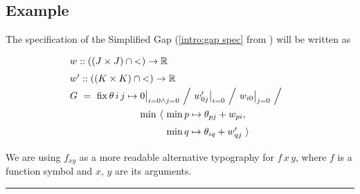 \subsection{Example \hrulefill}

The specification of the Simplified Gap (\eqref{intro:gap spec} from ) will be written as
%
\begin{equation}
  \renewcommand\arraystretch{1.5}
  \begin{array}{@{}l@{}l@{}l@{}}
    \lspan3{w :: ((J\times J)\cap{<})\to\R} \\
    \lspan3{w' :: ((K\times K)\cap{<})\to\R} \\
    G ~=~ \fix \theta\,i\,j\mapsto{}
      & \lspan2{0\big|_{i=0\land j=0} ~\Big/~ w'_{0j}\big|_{i=0} ~\Big/~ w_{i0}\big|_{j=0} ~\Big/~} \\
      & \min~\langle~ & \min p\mapsto\theta_{pj}+w_{pi}, \\
      & & \min q\mapsto\theta_{iq}+w'_{qj} ~\rangle
  \end{array}
  \label{lang:gap spec}
\end{equation}

\medskip
We are using $f_{xy}$
as a more readable alternative typography for $f\,x\,y$,
where $f$ is a function symbol and $x$, $y$ are its arguments.

\medskip
\hrule
